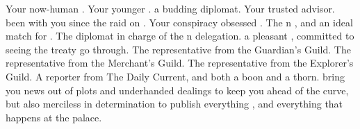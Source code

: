 \documentclass[char]{NeptuneBall}
\begin{document}
\begin{contacts}
  \contact{\cAriel{}} Your now-human \cAriel{\offspring}.
  \contact{\cPrincess{}} Your younger \cPrincess{\offspring}. \cPrincess{\They} \cPrincess{\are} a budding diplomat.
  \contact{\cManta{}} Your trusted advisor. \cManta{\They{}} \cManta{\have} been with you since the raid on \pPacifica{}.
  \contact{\cPlant{}} Your conspiracy obsessed \cPlant{\sibling}.
  \contact{\cPrince{}} The \pPacifica{}n \cPrince{\prince}, and an ideal match for \cPrincess{}.
  \contact{\cDiplomat{}} The diplomat in charge of the \pPacifica{}n delegation. \cDiplomat{\They} \cDiplomat{\are} a pleasant \cDiplomat{\mer}, committed to seeing the treaty go through.
  \contact{\cGeneral{}} The representative from the Guardian's Guild.
  \contact{\cSlave{}} The representative from the Merchant's Guild.
  \contact{\cPriest{}} The representative from the Explorer's Guild.
	\contact{\cReporter{}} A reporter from The Daily Current, and both a boon and a thorn. \cReporter{\They} bring you news \cReporter{\they}  out of plots and underhanded dealings to keep you ahead of the curve, but \cReporter{\they} \cReporter{\are} also merciless in \cReporter{\their} determination to publish everything \cReporter{\they} , and everything that happens at the palace.
\end{contacts}
\end{document}
